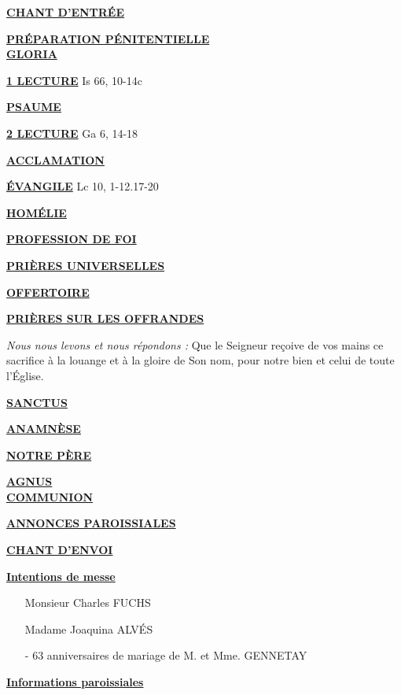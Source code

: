 \documentclass[french,11pt]{article}
\newcommand*{\chants}{../chants}
\newcommand*{\messe}{../messe_david_julien}
\newcommand*{\pu}{../pu}
\newcommand*{\psaumes}{../psaumes}
\newcommand{\NewsItem}[1]{%
\vspace{3pt}
\underline{\textbf{#1}}
		  }
\begin{document}
\NewsItem{CHANT D'ENTRÉE}
	

\NewsItem{PRÉPARATION PÉNITENTIELLE} \\
	

\NewsItem{GLORIA}
	


\NewsItem{1\iere{} LECTURE} Is 66, 10-14c

\NewsItem{PSAUME}


\NewsItem{2\ieme{} LECTURE}  Ga 6, 14-18

\NewsItem{ACCLAMATION}


\NewsItem{ÉVANGILE} Lc 10, 1-12.17-20

\NewsItem{HOMÉLIE}

\NewsItem{PROFESSION DE FOI}
%


\NewsItem{PRIÈRES UNIVERSELLES}


\NewsItem{OFFERTOIRE}

\NewsItem{PRIÈRES SUR LES OFFRANDES}
\textit{Nous nous levons et nous répondons : }
Que le Seigneur reçoive de vos mains ce sacrifice à la louange et à la gloire
de Son nom, pour notre bien et celui de toute l’Église.

\NewsItem{SANCTUS}


\NewsItem{ANAMNÈSE}


\NewsItem{NOTRE PÈRE}

\NewsItem{AGNUS} \\


\NewsItem{COMMUNION}


\NewsItem{ANNONCES PAROISSIALES}


\NewsItem{CHANT D'ENVOI}




\NewsItem{Intentions de messe}
\begin{itemize}
\item[\Cross] Monsieur Charles FUCHS
\item[\Cross] Madame Joaquina ALVÉS
\item[-] 63\ieme{} anniversaires de mariage de M. et Mme. GENNETAY
\end{itemize}

\newpage

\NewsItem{Informations paroissiales}
\end{document}
